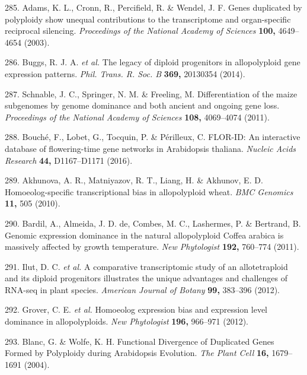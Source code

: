 \documentclass[12pt,]{book}
\begin{document}
\hypertarget{ref-adams_genes_2003}{}
285. Adams, K. L., Cronn, R., Percifield, R. \& Wendel, J. F. Genes
duplicated by polyploidy show unequal contributions to the transcriptome
and organ-specific reciprocal silencing. \emph{Proceedings of the
National Academy of Sciences} \textbf{100,} 4649--4654 (2003).

\hypertarget{ref-buggs_legacy_2014}{}
286. Buggs, R. J. A. \emph{et al.} The legacy of diploid progenitors in
allopolyploid gene expression patterns. \emph{Phil. Trans. R. Soc. B}
\textbf{369,} 20130354 (2014).

\hypertarget{ref-schnable_differentiation_2011}{}
287. Schnable, J. C., Springer, N. M. \& Freeling, M. Differentiation of
the maize subgenomes by genome dominance and both ancient and ongoing
gene loss. \emph{Proceedings of the National Academy of Sciences}
\textbf{108,} 4069--4074 (2011).

\hypertarget{ref-bouche_florid_2016}{}
288. Bouché, F., Lobet, G., Tocquin, P. \& Périlleux, C. FLOR-ID: An
interactive database of flowering-time gene networks in Arabidopsis
thaliana. \emph{Nucleic Acids Research} \textbf{44,} D1167--D1171
(2016).

\hypertarget{ref-akhunova_homoeolog_2010}{}
289. Akhunova, A. R., Matniyazov, R. T., Liang, H. \& Akhunov, E. D.
Homoeolog-specific transcriptional bias in allopolyploid wheat.
\emph{BMC Genomics} \textbf{11,} 505 (2010).

\hypertarget{ref-bardil_genomic_2011}{}
290. Bardil, A., Almeida, J. D. de, Combes, M. C., Lashermes, P. \&
Bertrand, B. Genomic expression dominance in the natural allopolyploid
Coffea arabica is massively affected by growth temperature. \emph{New
Phytologist} \textbf{192,} 760--774 (2011).

\hypertarget{ref-ilut_comparative_2012}{}
291. Ilut, D. C. \emph{et al.} A comparative transcriptomic study of an
allotetraploid and its diploid progenitors illustrates the unique
advantages and challenges of RNA-seq in plant species. \emph{American
Journal of Botany} \textbf{99,} 383--396 (2012).

\hypertarget{ref-grover_homoeolog_2012}{}
292. Grover, C. E. \emph{et al.} Homoeolog expression bias and
expression level dominance in allopolyploids. \emph{New Phytologist}
\textbf{196,} 966--971 (2012).

\hypertarget{ref-blanc_functional_2004}{}
293. Blanc, G. \& Wolfe, K. H. Functional Divergence of Duplicated Genes
Formed by Polyploidy during Arabidopsis Evolution. \emph{The Plant Cell}
\textbf{16,} 1679--1691 (2004).
\end{document}
